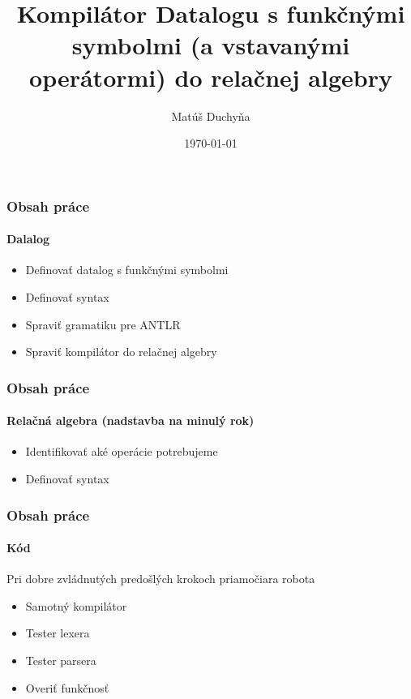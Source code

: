 \documentclass[11pt]{beamer}
\title{Kompilátor Datalogu s funkčnými symbolmi (a vstavanými operátormi) do relačnej algebry}
\author{Matúš Duchyňa}
\institute{
    Fakulta matematiky, fyziky a informatiky \\
    Univerzita Komenského v Bratislave
    \vspace{0.5em} %
    \\
    Vedúci práce: doc. Mgr. Tomáš Plachetka, Dr.
}
\date{\today}
\begin{document}
\frame{\titlepage}

\begin{frame}
\frametitle{Obsah práce}
\framesubtitle{Dalalog}
\begin{itemize}
    \item Definovať datalog s funkčnými symbolmi
    \item Definovať syntax
    \item Spraviť gramatiku pre ANTLR
    \item Spraviť kompilátor do relačnej algebry
\end{itemize}
\end{frame}

\begin{frame}
\frametitle{Obsah práce}
\framesubtitle{Relačná algebra (nadstavba na minulý rok)}
\begin{itemize}
    \item Identifikovať aké operácie potrebujeme
    \item Definovať syntax
\end{itemize}
\end{frame}

\begin{frame}
\frametitle{Obsah práce}
\framesubtitle{Kód}
Pri dobre zvládnutých predošlých krokoch priamočiara robota
\begin{itemize}
    \item Samotný kompilátor
    \item Tester lexera
    \item Tester parsera
    \item Overiť funkčnosť
\end{itemize}
\end{frame}
\end{document}
